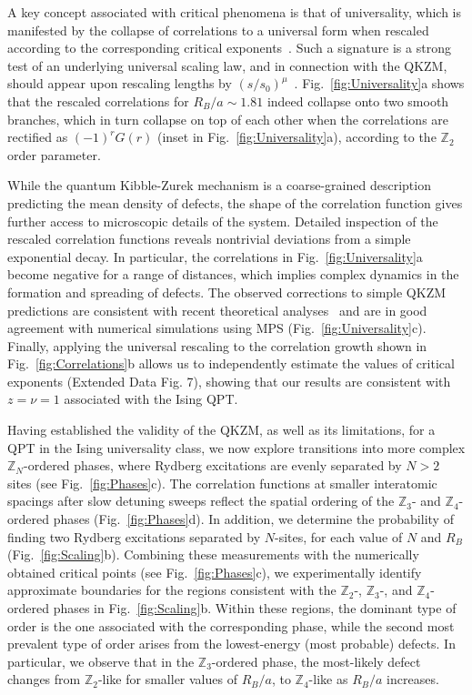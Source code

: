 \documentclass[prl,nobalancelastpage,superscriptaddress,twocolumn,nofootinbib]{revtex4}
\begin{document}
A key concept associated with critical phenomena is that of universality, which is manifested by the collapse of correlations to a universal form when rescaled according to the corresponding critical exponents~\cite{Sachdev2009}. Such a signature is a strong test of an underlying universal scaling law, and in connection with the QKZM, should appear upon rescaling lengths by $(s/s_0)^{\mu}$~\cite{Kolodrubetz2012}.  Fig.~\ref{fig:Universality}a shows that the rescaled correlations for $R_B/a \sim 1.81$ indeed collapse onto two smooth branches, which in turn collapse on top of each other when the correlations are rectified as $(-1)^{r}G(r)$ (inset in Fig.~\ref{fig:Universality}a), according to the $\mathbb{Z}_2$ order parameter.

While the quantum Kibble-Zurek mechanism is a coarse-grained description predicting the mean density of defects, the shape of the correlation function gives further access to microscopic details of the system. Detailed inspection of the rescaled correlation functions reveals nontrivial deviations from a simple exponential decay. In particular, the correlations in Fig.~\ref{fig:Universality}a become negative for a range of distances, which implies complex dynamics in the formation and spreading of defects. 
The observed corrections to simple QKZM predictions are consistent with recent theoretical analyses~\cite{Kolodrubetz2012,Cherng2006} and are in good agreement with numerical simulations using MPS (Fig.~\ref{fig:Universality}c). 
Finally, applying the universal rescaling to the correlation growth shown in Fig.~\ref{fig:Correlations}b allows us to independently estimate the values of critical exponents (Extended Data Fig. 7), showing that our results are consistent with $z=\nu=1$ associated with the Ising QPT. 

Having established the validity of the QKZM, as well as its limitations, for a QPT in the  Ising universality class, we now explore transitions into more complex  $\mathbb{Z}_N$-ordered phases, where Rydberg excitations are evenly separated by $N>2$ sites (see Fig.~\ref{fig:Phases}c).
The correlation functions at smaller interatomic spacings after slow detuning sweeps 
reflect the spatial ordering of the $\mathbb{Z}_3$- and $\mathbb{Z}_4$-ordered phases (Fig.~\ref{fig:Phases}d).
In addition, we determine the probability of finding two Rydberg excitations separated by $N$-sites, for each value of $N$ and $R_B$ (Fig.~\ref{fig:Scaling}b). Combining these measurements with the numerically obtained critical points (see Fig.~\ref{fig:Phases}c), we experimentally identify approximate boundaries for the regions consistent with the $\mathbb{Z}_2$-, $\mathbb{Z}_3$-, and $\mathbb{Z}_4$-ordered phases in Fig.~\ref{fig:Scaling}b. Within these regions, the dominant type of order is the one associated with the corresponding phase, while the second most prevalent type of order arises from the lowest-energy (most probable) defects. In particular, we observe that in the $\mathbb{Z}_3$-ordered phase, the most-likely defect changes from $\mathbb{Z}_2$-like for smaller values of $R_B/a$, to $\mathbb{Z}_4$-like as $R_B/a$ increases. 
\end{document}
